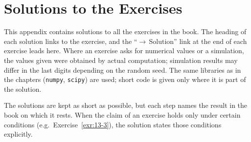 \documentclass[main.tex]{subfiles}
\begin{document}
\chapter{Solutions to the Exercises}\label{ek:cozumler}

This appendix contains solutions to all the exercises in the book. The heading of each solution links to the exercise, and the ``$\rightarrow$\,Solution'' link at the end of each exercise leads here. Where an exercise asks for numerical values or a simulation, the values given were obtained by actual computation; simulation results may differ in the last digits depending on the random seed. The same libraries as in the chapters (\texttt{numpy}, \texttt{scipy}) are used; short code is given only where it is part of the solution.

The solutions are kept as short as possible, but each step names the result in the book on which it rests. When the claim of an exercise holds only under certain conditions (e.g.\ Exercise~\ref{exr:13-3}), the solution states those conditions explicitly.




\end{document}
